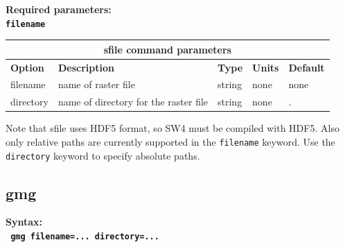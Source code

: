 \documentclass[11pt]{report}
\begin{document}
{\begin{flushleft}
	\bf Required parameters:\\
	\tt filename
\end{flushleft}
%
\begin{center}
	\begin{tabular}{|l|p{8cm}|l|l||l|} \hline
		\multicolumn{5}{|c|}{\bf sfile command parameters}                                              \\ \hline
		{\bf Option} & {\bf Description}                     & {\bf Type} & {\bf Units} & {\bf Default} \\ \hline
		\hline
		filename     & name of raster file                   & string     & none        & none          \\ \hline
		directory    & name of directory for the raster file & string     & none        & .             \\ \hline
	\end{tabular}
\end{center}
Note that sfile uses HDF5 format, so SW4 must be compiled with HDF5. Also only relative paths are currently supported in the \verb+filename+ keyword. Use the
\verb+directory+ keyword to specify absolute paths.




%
\subsection{gmg}
\label{keyword:gmg}
\begin{flushleft}\bf
	Syntax:\\
	\tt
	gmg filename=... directory=...\\


\end{flushleft}}
\end{document}

